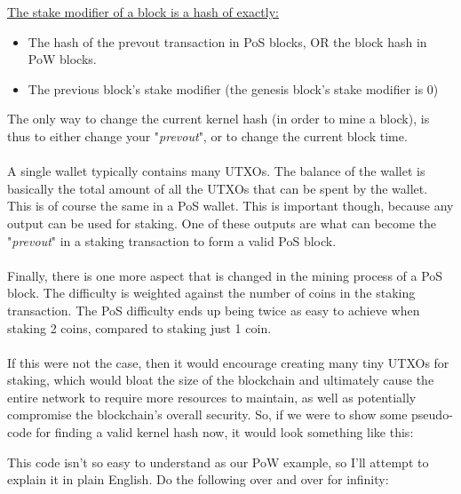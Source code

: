 \underline{The stake modifier of a block is a hash of exactly:}
\begin{itemize}
	\item The hash of the prevout transaction in PoS blocks, OR the block
	hash in PoW blocks.
	\item The previous block's stake modifier (the genesis block's stake
	modifier is 0)
\end{itemize}
\noindent
The only way to change the current kernel hash (in order to mine a block),
is thus to either change your "\textit{prevout}", or to change the current
block time.
\\
\\
\noindent
A single wallet typically contains many UTXOs. The balance of the wallet is
basically the total amount of all the UTXOs that can be spent by the wallet.
This is of course the same in a PoS wallet. This is important though, because
any output can be used for staking. One of these outputs are what can become
the "\textit{prevout}" in a staking transaction to form a valid PoS block.
\\
\\
\noindent
Finally, there is one more aspect that is changed in the mining process of a
PoS block. The difficulty is weighted against the number of coins in the
staking transaction. The PoS difficulty ends up being twice as easy to achieve
when staking 2 coins, compared to staking just 1 coin.
\\
\\
\noindent
If this were not the case, then it would encourage creating many tiny UTXOs
for staking, which would bloat the size of the blockchain and ultimately
cause the entire network to require more resources to maintain, as well as
potentially compromise the blockchain's overall security.
\newpage
\noindent
So, if we were to show some pseudo-code for finding a valid kernel hash now,
it would look something like this:



\vspace{5mm} %



\vspace{5mm} %


\noindent
This code isn't so easy to understand as our PoW example, so I'll attempt to
explain it in plain English. Do the following over and over for infinity:

\vspace{5mm} %

